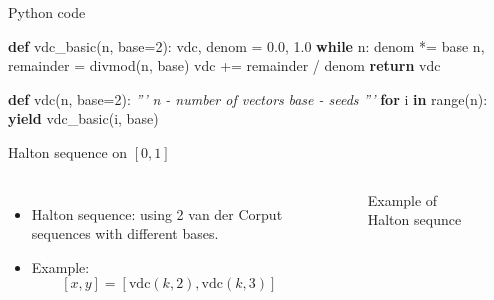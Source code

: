 \documentclass[10pt,ignorenonframetext,serif,onlymath]{beamer}
\newenvironment{Shaded}{}{}
\newcommand{\BuiltInTok}[1]{#1}
\newcommand{\CommentTok}[1]{\textcolor[rgb]{0.38,0.63,0.69}{\textit{#1}}}
\newcommand{\ControlFlowTok}[1]{\textcolor[rgb]{0.00,0.44,0.13}{\textbf{#1}}}
\newcommand{\DecValTok}[1]{\textcolor[rgb]{0.25,0.63,0.44}{#1}}
\newcommand{\FloatTok}[1]{\textcolor[rgb]{0.25,0.63,0.44}{#1}}
\newcommand{\KeywordTok}[1]{\textcolor[rgb]{0.00,0.44,0.13}{\textbf{#1}}}
\newcommand{\NormalTok}[1]{#1}
\newcommand{\OperatorTok}[1]{\textcolor[rgb]{0.40,0.40,0.40}{#1}}
\begin{document}
\begin{frame}[fragile]{Python code}
\protect\hypertarget{python-code}{}

\begin{Shaded}
\begin{Highlighting}[]
\KeywordTok{def}\NormalTok{ vdc_basic(n, base}\OperatorTok{=}\DecValTok{2}\NormalTok{):}
\NormalTok{    vdc, denom }\OperatorTok{=} \FloatTok{0.0}\NormalTok{, }\FloatTok{1.0}
    \ControlFlowTok{while}\NormalTok{ n:}
\NormalTok{        denom }\OperatorTok{*=}\NormalTok{ base}
\NormalTok{        n, remainder }\OperatorTok{=} \BuiltInTok{divmod}\NormalTok{(n, base)}
\NormalTok{        vdc }\OperatorTok{+=}\NormalTok{ remainder }\OperatorTok{/}\NormalTok{ denom}
    \ControlFlowTok{return}\NormalTok{ vdc}

\KeywordTok{def}\NormalTok{ vdc(n, base}\OperatorTok{=}\DecValTok{2}\NormalTok{):}
    \CommentTok{'''}
\CommentTok{    n - number of vectors}
\CommentTok{    base - seeds}
\CommentTok{    '''}
    \ControlFlowTok{for}\NormalTok{ i }\KeywordTok{in} \BuiltInTok{range}\NormalTok{(n):}
        \ControlFlowTok{yield}\NormalTok{ vdc_basic(i, base)}
\end{Highlighting}
\end{Shaded}

\end{frame}

\begin{frame}{Halton sequence on \([0,1]\)}
\protect\hypertarget{halton-sequence-on-01}{}

\begin{columns}


\begin{itemize}
\item
  Halton sequence: using 2 van der Corput sequences with different
  bases.
\item
  Example: \[[x,y] = [\mathrm{vdc}(k,2), \mathrm{vdc}(k,3)]\]
\end{itemize}


\begin{figure}[hp]
\centering

\caption{Example of Halton sequnce}%
\label{fig:halton}
\end{figure}

\end{columns}

\end{frame}
\end{document}
